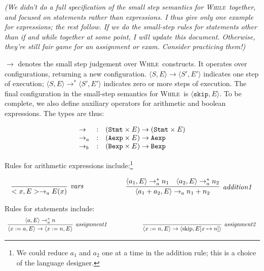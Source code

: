 \documentclass[11pt]{article}
\def\While{\textsc{While}}
\begin{document}
\emph{(We didn't do a full specification of the small step semantics for \While\ together, and focused on statements rather than expressions.  I thus give only one example for expressions; the rest follow.  If we do the small-step rules for statements other than if and while together at some point, I will update this document.  Otherwise, they're still fair game for an assignment or exam. Consider practicing them!)}

$\rightarrow$ denotes the small step judgement over \While\ constructs.  It operates over configurations, returning a new configuration.  $\langle S, E \rangle \rightarrow \langle S', E' \rangle $ indicates one step of execution; $\langle S, E\rangle \rightarrow^* \langle S', E' \rangle $ indicates zero or more steps of execution. 
The final configuration in the small-step semantics for \While\ is  $\langle \mathtt{skip}, E\rangle$.  
To be complete, we also define auxiliary operators for arithmetic and boolean expressions.  
The types are thus:

\[
\begin{array}{lll}
\rightarrow & : & (\mathtt{Stmt} \times E) \rightarrow (\mathtt{Stmt} \times E) \\
\rightarrow_a & : & (\mathtt{Aexp} \times E) \rightarrow \mathtt{Aexp} \\
\rightarrow_b & : & (\mathtt{Bexp} \times E) \rightarrow \mathtt{Bexp} \\
\end{array}
\]

Rules for arithmetic expressions include:\footnote{We could reduce $a_1$ and $a_2$ one at a time in the addition rule; this is a choice of the language designer.}

\[
\begin{array}{lcr}
\infer[$\textit{vars}$]{<x, E> \rightarrow_a E(x)}{}
  &~~~~~~~~~~~~&
\infer[$\textit{addition1}$]{\langle a_1 + a_2, E \rangle \rightarrow_a n_1 + n_2}{\langle a_1, E \rangle \rightarrow_a^* n_1  & \langle a_2, E \rangle \rightarrow_a^* n_2}
\end{array}
\]

Rules for statements include:
\[
\begin{array}{lcr}
\infer[$\textit{assignment1}$]{\langle x := a, E \rangle \rightarrow \langle x := n, E \rangle}{\langle a, E \rangle \rightarrow_a^* n} 
  &~~~~~~~~~~~~&
\infer[$\textit{assignment2}$]{\langle x := n, E \rangle \rightarrow \langle \mbox{skip}, E[x \mapsto n] \rangle}{} 
\end{array}
\]
\end{document}
